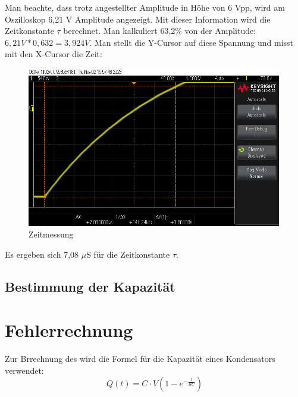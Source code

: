 Man beachte, dass trotz angestellter Amplitude in Höhe von
6 Vpp, wird am Oszilloskop 6,21 V Amplitude angezeigt. Mit dieser 
Information wird die Zeitkonstante $\tau$ berechnet. Man kalkuliert
63,2\% von der Amplitude: $6,21V * 0,632 = 3,924V$. Man stellt die 
Y-Cursor auf diese Spannung und misst mit den X-Cursor die Zeit:
\begin{figure}[H]
	\centering
	\includegraphics[height=7cm]{images/Versuch1/Zeitmessung.png} 
	\caption{Zeitmessung}
	\label{fig: Zeitmessung}
\end{figure}

Es ergeben sich 7,08 $\mu$S für die Zeitkonstante $\tau$. 

\subsection{Bestimmung der Kapazität}



\section{Fehlerrechnung}


Zur Brrechnung des wird die Formel für die Kapazität eines Kondensators verwendet:
\begin{equation}
    Q(t) = C \cdot V \left(1 - e^{-\frac{t}{RC}}\right)
\end{equation}

